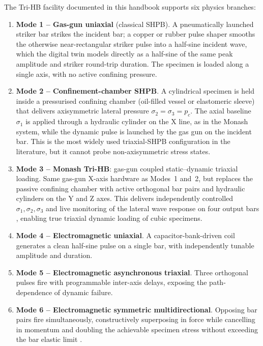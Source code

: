 \documentclass[11pt,a4paper,openany]{book}
\theoremstyle{handbook}
\newcommand{\sig}{\sigma}
\begin{document}
The Tri-HB facility documented in this handbook supports six physics branches:

\begin{enumerate}[leftmargin=2.4em,itemsep=4pt]
\item \textbf{Mode 1 -- Gas-gun uniaxial} (classical SHPB). A pneumatically
      launched striker bar strikes the incident bar; a copper or rubber pulse
      shaper smooths the otherwise near-rectangular striker pulse into a
      half-sine incident wave, which the digital twin models directly as a
      half-sine of the same peak amplitude and striker round-trip duration.
      The specimen is loaded along a single axis, with no active confining
      pressure.
\item \textbf{Mode 2 -- Confinement-chamber SHPB}. A cylindrical specimen
      is held inside a pressurised confining chamber (oil-filled vessel or
      elastomeric sleeve) that delivers axisymmetric lateral pressure
      $\sig_2=\sig_3=p_c$. The axial baseline $\sig_1$ is applied through
      a hydraulic cylinder on the X line, as in the Monash system, while
      the dynamic pulse is launched by the gas gun on the incident bar.
      This is the most widely used triaxial-SHPB configuration in the
      literature, but it cannot probe non-axisymmetric stress states.
\item \textbf{Mode 3 -- Monash Tri-HB}: gas-gun coupled static--dynamic
      triaxial loading. Same gas-gun X-axis hardware as Modes~1 and~2, but
      replaces the passive confining chamber with active orthogonal bar
      pairs and hydraulic cylinders on the Y and Z axes. This delivers
      independently controlled $\sig_1,\sig_2,\sig_3$ and live monitoring
      of the lateral wave response on four output bars
      \cite{Liu2019,Zhang2019Tri}, enabling true triaxial dynamic loading
      of cubic specimens.
\item \textbf{Mode 4 -- Electromagnetic uniaxial}. A capacitor-bank-driven
      coil generates a clean half-sine pulse on a single bar, with
      independently tunable amplitude and duration.
\item \textbf{Mode 5 -- Electromagnetic asynchronous triaxial}. Three
      orthogonal pulses fire with programmable inter-axis delays, exposing
      the path-dependence of dynamic failure.
\item \textbf{Mode 6 -- Electromagnetic symmetric multidirectional}.
      Opposing bar pairs fire simultaneously, constructively superposing in
      force while cancelling in momentum and doubling the achievable
      specimen stress without exceeding the bar elastic limit \cite{xie2021}.
\end{enumerate}
\end{document}
